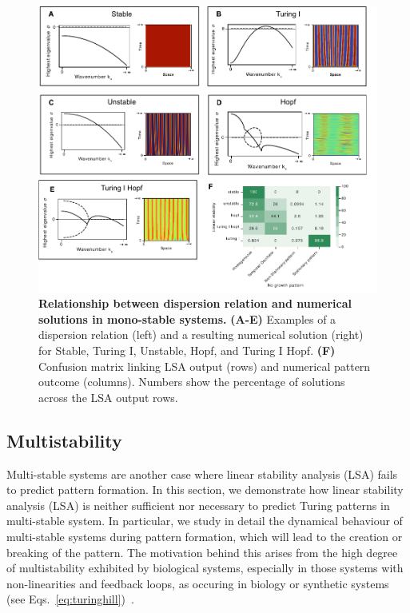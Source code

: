 \begin{figure}[H]
    \includegraphics[width=1\textwidth]{figures/dispersion} %
    \caption{\textbf{Relationship between dispersion relation and numerical solutions in mono-stable systems.} \textbf{(A-E)} Examples of a dispersion relation (left) and a resulting numerical solution (right) for Stable, Turing I, Unstable, Hopf, and Turing I Hopf. \textbf{(F)} Confusion matrix linking LSA output (rows) and numerical pattern outcome (columns). Numbers show the percentage of solutions across the LSA output rows.}
    \label{fig:dispersions} %
\end{figure}


\subsection{Multistability}

Multi-stable systems are another case where linear stability analysis (LSA) fails to predict pattern formation.  In this section, we demonstrate how linear stability analysis (LSA) is neither sufficient 
nor necessary to predict Turing patterns in multi-stable system. In particular, we study in detail the dynamical behaviour of multi-stable systems during pattern formation, which will lead to the creation or breaking of the pattern.
The motivation behind this arises from the high degree of multistability exhibited by biological systems, especially in those systems with non-linearities and feedback loops, as occuring in biology or synthetic systems (see Eqs.~\ref{eq:turinghill})~\parencite{pham2020complexity, leite2009multistability}.

